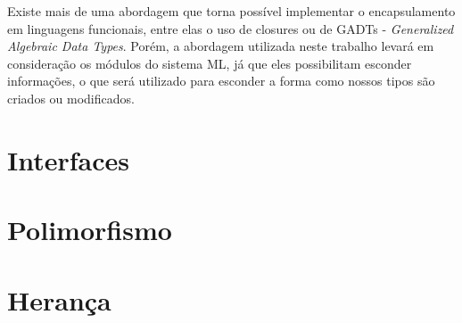 Existe mais de uma abordagem que torna 
possível implementar o encapsulamento em 
linguagens funcionais, entre elas o uso 
de closures\cite{classlessjs} ou de 
GADTs - \textit{Generalized Algebraic 
Data Types}\cite{existentialhaskell}. 
Porém, a abordagem utilizada neste 
trabalho levará em consideração os 
módulos do sistema ML, já que eles 
possibilitam esconder informações, 
o que será utilizado para esconder a 
forma como nossos tipos são criados 
ou modificados\cite{mlmodules}.


\section{Interfaces}


\section{Polimorfismo}


\section{Herança}

